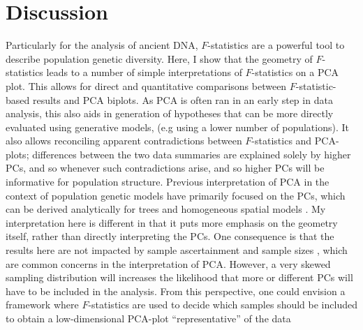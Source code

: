 \documentclass[12pt,fullpage, a4paper]{article}
\begin{document}
\section{Discussion}
Particularly for the analysis of ancient DNA, $F$-statistics  are  a powerful tool to describe population genetic diversity. Here, I show that the geometry of $F$-statistics \citep{oteo-garcia2021} leads to a number of simple interpretations of $F$-statistics on a PCA plot. This allows for direct and quantitative comparisons between $F$-statistic-based results and PCA biplots. As PCA is often ran in an early step in data analysis, this also aids in generation of hypotheses that can be more directly evaluated using generative models, (e.g using a lower number of populations). It also allows reconciling apparent contradictions between $F$-statistics and PCA-plots; differences between the two data summaries are explained solely by higher PCs, and so whenever such contradictions arise, and so higher PCs will be informative for population structure. Previous interpretation of PCA in the context of population genetic models have primarily focused on the PCs, which can be derived analytically for trees \citep{cavalli-sforza1975} and homogeneous spatial models \citep{novembre2008a}. My interpretation here is different in that it puts more emphasis on the geometry itself, rather than directly interpreting the PCs. One consequence is that the results here are not impacted by sample ascertainment and sample sizes \citep{mcvean2009, novembre2008a}, which are common concerns in the interpretation of PCA. However, a very skewed sampling distribution will increases the likelihood that more or different PCs will have to be included in the analysis. From this perspective, one could envision a framework where $F$-statistics are used to decide which samples should be included to obtain a low-dimensional PCA-plot ``representative'' of the data
\end{document}
